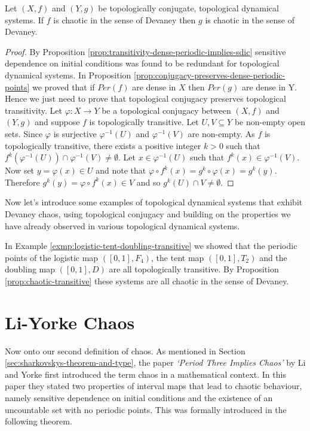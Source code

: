 \begin{prop}
    Let $(X, f)$ and $(Y, g)$ be topologically conjugate, topological dynamical systems. If $f$ is chaotic in the sense of Devaney then $g$ is chaotic in the sense of Devaney.
    \begin{proof}
        By Proposition \ref{prop:transitivity-dense-periodic-implies-sdic} sensitive dependence on initial conditions was found to be redundant for topological dynamical systems. In Proposition \ref{prop:conjugacy-preserves-dense-periodic-points} we proved that if $Per(f)$ are dense in $X$ then $Per(g)$ are dense in Y. Hence we just need to prove that topological conjugacy preserves topological transitivity. Let $\varphi: X \to Y$ be a topological conjugacy between $(X, f)$ and $(Y, g)$ and suppose $f$ is topologically transitive. Let $U, V \subseteq Y$ be non-empty open sets. Since $\varphi$ is surjective $\varphi^{-1}(U)$ and $\varphi^{-1}(V)$ are non-empty. As $f$ is topologically transitive, there exists a positive integer $k > 0$ such that $f^k(\varphi^{-1}(U)) \cap \varphi^{-1}(V) \neq \emptyset$. Let $x \in \varphi^{-1}(U)$ such that $f^k(x) \in \varphi^{-1}(V)$. Now set $y = \varphi(x) \in U$ and note that $\varphi \circ f^k(x) = g^k \circ \varphi(x) = g^k(y)$. Therefore $g^k(y) = \varphi \circ f^k(x) \in V$ and so $g^k(U) \cap V \neq \emptyset$.
    \end{proof}
\end{prop}

Now let's introduce some examples of topological dynamical systems that exhibit Devaney chaos, using topological conjugacy and building on the properties we have already observed in various topological dynamical systems.

\begin{exmp}
    In Example \ref{exmp:logistic-tent-doubling-transitive} we showed that the periodic points of the logistic map $([0, 1], F_4)$, the tent map $([0, 1], T_2)$ and the doubling map $([0, 1], D)$ are all topologically transitive. By Proposition \ref{prop:chaotic-transitive} these systems are all chaotic in the sense of Devaney.
\end{exmp}

\section{Li-Yorke Chaos} \label{sec:li-yorke-chaos}

Now onto our second definition of chaos. As mentioned in Section \ref{sec:sharkovskys-theorem-and-type}, the paper \emph{`Period Three Implies Chaos'} by Li and Yorke \cite{li-yorke} first introduced the term chaos in a mathematical context. In this paper they stated two properties of interval maps that lead to chaotic behaviour, namely sensitive dependence on initial conditions and the existence of an uncountable set with no periodic points. This was formally introduced in the following theorem.

